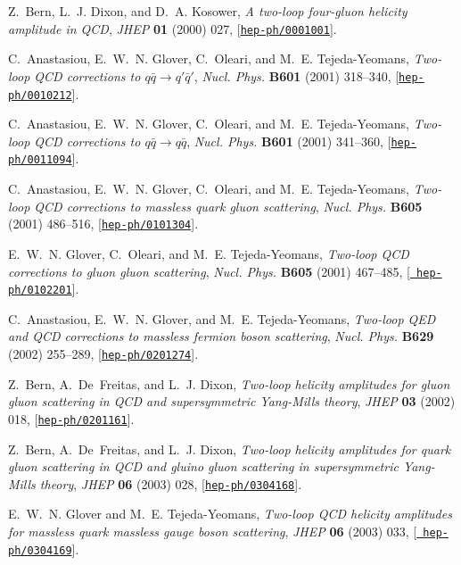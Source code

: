 \documentclass[paper,notoc,nohyper]{JHEP3}
\begin{document}
\begin{thebibliography}{10}
Z.~Bern, L.~J. Dixon, and D.~A. Kosower, {\it A two-loop four-gluon helicity
  amplitude in {QCD}},  {\em JHEP} {\bf 01} (2000) 027,
  [\href{http://xxx.lanl.gov/abs/hep-ph/0001001}{{\tt hep-ph/0001001}}].

C.~Anastasiou, E.~W.~N. Glover, C.~Oleari, and M.~E. Tejeda-Yeomans, {\it
  Two-loop {QCD} corrections to $q\bar{q} \rightarrow q' \bar{q}'$},  {\em
  Nucl. Phys.} {\bf B601} (2001) 318--340,
  [\href{http://xxx.lanl.gov/abs/hep-ph/0010212}{{\tt hep-ph/0010212}}].

C.~Anastasiou, E.~W.~N. Glover, C.~Oleari, and M.~E. Tejeda-Yeomans, {\it
  Two-loop {QCD} corrections to $q\bar{q} \rightarrow q\bar{q}$},  {\em Nucl.
  Phys.} {\bf B601} (2001) 341--360,
  [\href{http://xxx.lanl.gov/abs/hep-ph/0011094}{{\tt hep-ph/0011094}}].

C.~Anastasiou, E.~W.~N. Glover, C.~Oleari, and M.~E. Tejeda-Yeomans, {\it
  Two-loop {QCD} corrections to massless quark gluon scattering},  {\em Nucl.
  Phys.} {\bf B605} (2001) 486--516,
  [\href{http://xxx.lanl.gov/abs/hep-ph/0101304}{{\tt hep-ph/0101304}}].

E.~W.~N. Glover, C.~Oleari, and M.~E. Tejeda-Yeomans, {\it Two-loop {QCD}
  corrections to gluon gluon scattering},  {\em Nucl. Phys.} {\bf B605} (2001)
  467--485, [\href{http://xxx.lanl.gov/abs/hep-ph/0102201}{{\tt
  hep-ph/0102201}}].

C.~Anastasiou, E.~W.~N. Glover, and M.~E. Tejeda-Yeomans, {\it Two-loop {QED}
  and {QCD} corrections to massless fermion boson scattering},  {\em Nucl.
  Phys.} {\bf B629} (2002) 255--289,
  [\href{http://xxx.lanl.gov/abs/hep-ph/0201274}{{\tt hep-ph/0201274}}].

Z.~Bern, A.~De~Freitas, and L.~J. Dixon, {\it Two-loop helicity amplitudes for
  gluon gluon scattering in {QCD} and supersymmetric {Y}ang-{M}ills theory},
  {\em JHEP} {\bf 03} (2002) 018,
  [\href{http://xxx.lanl.gov/abs/hep-ph/0201161}{{\tt hep-ph/0201161}}].

Z.~Bern, A.~De~Freitas, and L.~J. Dixon, {\it Two-loop helicity amplitudes for
  quark gluon scattering in {QCD} and gluino gluon scattering in supersymmetric
  {Y}ang- {M}ills theory},  {\em JHEP} {\bf 06} (2003) 028,
  [\href{http://xxx.lanl.gov/abs/hep-ph/0304168}{{\tt hep-ph/0304168}}].

E.~W.~N. Glover and M.~E. Tejeda-Yeomans, {\it Two-loop {QCD} helicity
  amplitudes for massless quark massless gauge boson scattering},  {\em JHEP}
  {\bf 06} (2003) 033, [\href{http://xxx.lanl.gov/abs/hep-ph/0304169}{{\tt
  hep-ph/0304169}}].


\end{thebibliography}
\end{document}
